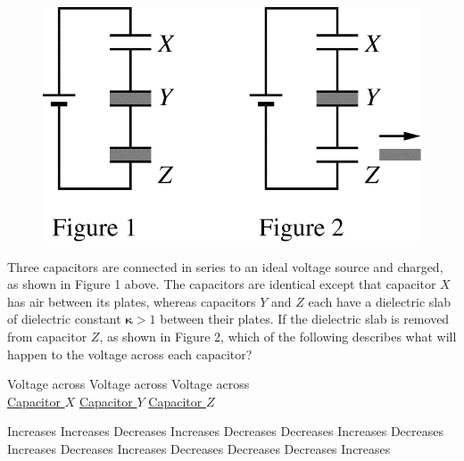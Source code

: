 \begin{figure}[H]
\centering
\includegraphics[scale=0.3]{images/img-006-010.png}
\end{figure}

\begin{questions}\setcounter{question}{9}\question
Three capacitors are connected in series to an ideal voltage source and charged, as shown in Figure 1 above. The capacitors are identical except that capacitor $X$ has air between its plates, whereas capacitors $Y$ and $Z$ each have a dielectric slab of dielectric constant $\boldsymbol{\kappa}>1$ between their plates. If the dielectric slab is removed from capacitor $Z$, as shown in Figure 2, which of the following describes what will happen to the voltage across each capacitor?

\tabto{0.75cm} Voltage across
\tabto{4.00cm} Voltage across
\tabto{7.25cm} Voltage across\\
\tabto{0.75cm} \underline{Capacitor $X$}
\tabto{4.00cm} \underline{Capacitor $Y$}
\tabto{7.25cm} \underline{Capacitor $Z$}

\begin{choices}
\choice Increases \tabto{3.25cm} Increases \tabto{6.50cm} Decreases
\choice Increases \tabto{3.25cm} Decreases \tabto{6.50cm} Decreases
\choice Increases \tabto{3.25cm} Decreases \tabto{6.50cm} Increases
\choice Decreases \tabto{3.25cm} Increases \tabto{6.50cm} Decreases
\choice Decreases \tabto{3.25cm} Decreases \tabto{6.50cm} Increases
\end{choices}\end{questions}
